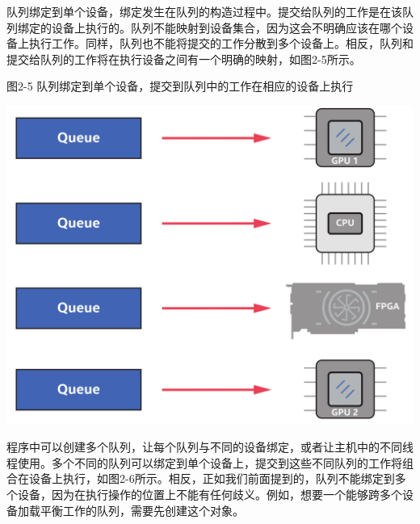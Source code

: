 队列绑定到单个设备，绑定发生在队列的构造过程中。提交给队列的工作是在该队列绑定的设备上执行的。队列不能映射到设备集合，因为这会不明确应该在哪个设备上执行工作。同样，队列也不能将提交的工作分散到多个设备上。相反，队列和提交给队列的工作将在执行设备之间有一个明确的映射，如图2-5所示。\par

\hspace*{\fill} \par %
图2-5 队列绑定到单个设备，提交到队列中的工作在相应的设备上执行
\begin{center}
	\includegraphics[width=1.\textwidth]{content/chapter-2/images/4}
\end{center}

程序中可以创建多个队列，让每个队列与不同的设备绑定，或者让主机中的不同线程使用。多个不同的队列可以绑定到单个设备上，提交到这些不同队列的工作将组合在设备上执行，如图2-6所示。相反，正如我们前面提到的，队列不能绑定到多个设备，因为在执行操作的位置上不能有任何歧义。例如，想要一个能够跨多个设备加载平衡工作的队列，需要先创建这个对象。\par


